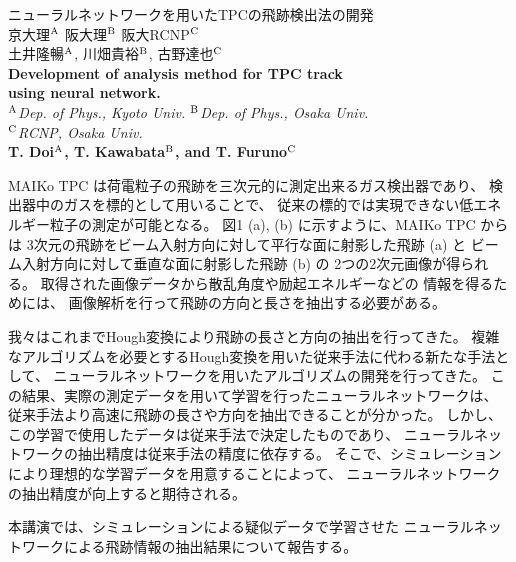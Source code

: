 \documentclass[12pt,a4paper]{jsarticle}
\begin{document}
\vspace{-5pt}
\begin{center}
  {\gt \Large ニューラルネットワークを用いたTPCの飛跡検出法の開発 }\\[14pt]
  
  {\gt \large 京大理$^{\rm{A}}$ 阪大理$^{\rm{B}}$ 阪大RCNP$^{\rm{C}}$\\
    土井隆暢$^{\rm{A}}$, 川畑貴裕$^{\rm{B}}$, 古野達也$^{\rm{C}}$}\\[5pt]
  
  {\large \bf Development of analysis method for TPC track \\
    using neural network.}\\[5pt]
  
  {\large \it $^{\rm{A}}$Dep. of Phys., Kyoto Univ. $^{\rm{B}}$Dep. of Phys., Osaka Univ. \\
    $^{\rm{C}}$RCNP, Osaka Univ.}\\
  
  {\large \bf T. Doi$^{\rm{A}}$, T. Kawabata$^{\rm{B}}$, and T. Furuno$^{\rm{C}}$}
\end{center}

\vspace{5pt}
MAIKo TPC%
は荷電粒子の飛跡を三次元的に測定出来るガス検出器であり、
検出器中のガスを標的として用いることで、
従来の標的では実現できない低エネルギー粒子の測定が可能となる。
図1 (a), (b) %
に示すように、MAIKo TPC からは
3次元の飛跡をビーム入射方向に対して平行な面に射影した飛跡 (a) と
ビーム入射方向に対して垂直な面に射影した飛跡 (b) の
2つの2次元画像が得られる。
取得された画像データから散乱角度や励起エネルギーなどの
情報を得るためには、
画像解析を行って飛跡の方向と長さを抽出する必要がある。

我々はこれまでHough変換により飛跡の長さと方向の抽出を行ってきた。
複雑なアルゴリズムを必要とするHough変換を用いた従来手法に代わる新たな手法として、
ニューラルネットワークを用いたアルゴリズムの開発を行ってきた。
この結果、実際の測定データを用いて学習を行ったニューラルネットワークは、
従来手法より高速に飛跡の長さや方向を抽出できることが分かった。
しかし、この学習で使用したデータは従来手法で決定したものであり、
ニューラルネットワークの抽出精度は従来手法の精度に依存する。
そこで、シミュレーションにより理想的な学習データを用意することによって、
ニューラルネットワークの抽出精度が向上すると期待される。

本講演では、シミュレーションによる疑似データで学習させた
ニューラルネットワークによる飛跡情報の抽出結果について報告する。
\end{document}
